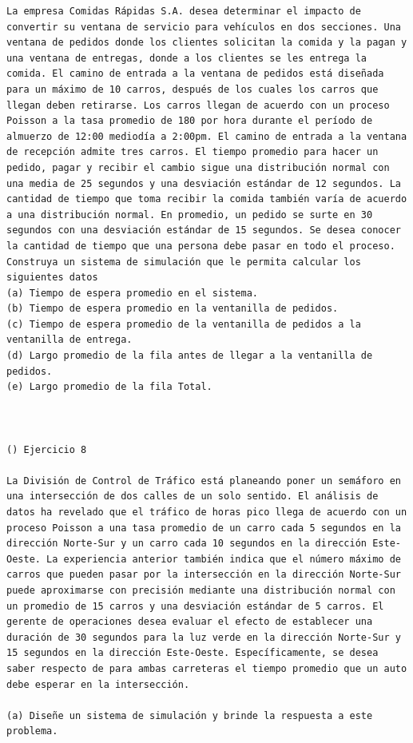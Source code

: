 \begin{verbatim}
La empresa Comidas Rápidas S.A. desea determinar el impacto de convertir su ventana de servicio para vehículos en dos secciones. Una ventana de pedidos donde los clientes solicitan la comida y la pagan y una ventana de entregas, donde a los clientes se les entrega la comida. El camino de entrada a la ventana de pedidos está diseñada para un máximo de 10 carros, después de los cuales los carros que llegan deben retirarse. Los carros llegan de acuerdo con un proceso Poisson a la tasa promedio de 180 por hora durante el período de almuerzo de 12:00 mediodía a 2:00pm. El camino de entrada a la ventana de recepción admite tres carros. El tiempo promedio para hacer un pedido, pagar y recibir el cambio sigue una distribución normal con una media de 25 segundos y una desviación estándar de 12 segundos. La cantidad de tiempo que toma recibir la comida también varía de acuerdo a una distribución normal. En promedio, un pedido se surte en 30 segundos con una desviación estándar de 15 segundos. Se desea conocer la cantidad de tiempo que una persona debe pasar en todo el proceso. Construya un sistema de simulación que le permita calcular los siguientes datos
(a) Tiempo de espera promedio en el sistema.
(b) Tiempo de espera promedio en la ventanilla de pedidos.
(c) Tiempo de espera promedio de la ventanilla de pedidos a la ventanilla de entrega.
(d) Largo promedio de la fila antes de llegar a la ventanilla de pedidos.
(e) Largo promedio de la fila Total.



() Ejercicio 8

La División de Control de Tráfico está planeando poner un semáforo en una intersección de dos calles de un solo sentido. El análisis de datos ha revelado que el tráfico de horas pico llega de acuerdo con un proceso Poisson a una tasa promedio de un carro cada 5 segundos en la dirección Norte-Sur y un carro cada 10 segundos en la dirección Este-Oeste. La experiencia anterior también indica que el número máximo de carros que pueden pasar por la intersección en la dirección Norte-Sur puede aproximarse con precisión mediante una distribución normal con un promedio de 15 carros y una desviación estándar de 5 carros. El gerente de operaciones desea evaluar el efecto de establecer una duración de 30 segundos para la luz verde en la dirección Norte-Sur y 15 segundos en la dirección Este-Oeste. Específicamente, se desea saber respecto de para ambas carreteras el tiempo promedio que un auto debe esperar en la intersección. 

(a) Diseñe un sistema de simulación y brinde la respuesta a este problema.


\end{verbatim}
